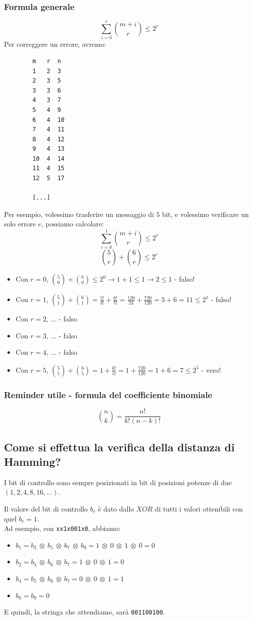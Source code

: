 \subsubsection{Formula generale}
$$
\sum _{i=0}^e \binom{m+i}{r} \leq 2^r
$$
Per correggere un errore, avremo:
\begin{footnotesize}
	\begin{verbatim}
		m   r  n  
		1   2  3  
		2   3  5  
		3   3  6  
		4   3  7  
		5   4  9  
		6   4  10 
		7   4  11 
		8   4  12 
		9   4  13 
		10  4  14 
		11  4  15 
		12  5  17 
		
		[...]
	\end{verbatim}
\end{footnotesize}

Per esempio, volessimo trasferire un messaggio di $5$ bit, e volessimo verificare un solo errore $e$, possiamo calcolare:
$$
\sum_{i=0}^{1} \binom{m+i}{r} \leq 2^r
$$
$$
\binom{5}{r} + \binom{6}{r} \leq 2^r
$$
\begin{itemize}
	\item Con $r=0$, $\binom{5}{0} + \binom{6}{0} \leq 2^0 \to 1 + 1 \leq 1 \to 2 \leq 1 $ - falso!
	\item Con $r=1$, $\binom{5}{1} + \binom{6}{1} = \frac{5!}{4!} + \frac{6!}{5!} = \frac{120}{24} + \frac{720}{120} = 5 + 6 = 11 \leq 2^1 $ - falso!
	\item Con $r=2$, $\dots$ - falso
	\item Con $r=3$, $\dots$ - falso
	\item Con $r=4$, $\dots$ - falso
	\item Con $r=5$, $\binom{5}{5} + \binom{6}{5} = 1 + \frac{6!}{5!} = 1 + \frac{720}{120} = 1 + 6 = 7 \leq 2^5 $ - vero!
\end{itemize}

\subsubsection{Reminder utile - formula del coefficiente binomiale}
$$
\binom{n}{k} = \frac{n!}{k!(n-k)!}
$$
\newpage

\subsection{Come si effettua la verifica della distanza di Hamming?}
I bit di controllo sono sempre posizionati in bit di posizioni potenze di due $(1,2,4,8,16,\dots)$.

Il valore del bit di controllo $b_r$ è dato dallo $XOR$ di tutti i valori ottenibili con quel $b_r=1$.\\
Ad esempio, con \verb|xx1x001x0|, abbiamo:
\begin{itemize}
	\item $b_1 = b_3 \ \otimes \ b_5 \ \otimes \ b_7 \ \otimes \ b_9 =  1 \ \otimes \ 0 \ \otimes \ 1 \ \otimes \ 0 = 0$
	\item $b_2 = b_3 \ \otimes \ b_6 \ \otimes \ b_7 = 1 \ \otimes \ 0 \ \otimes \ 1  = 0$
	\item $b_4 = b_5 \ \otimes \ b_6 \ \otimes \ b_7 = 0 \ \otimes \ 0 \ \otimes \ 1  = 1$
	\item $b_8 = b_9 = 0 $
\end{itemize}
E quindi, la stringa che attendiamo, sarà \verb|001100100|.

